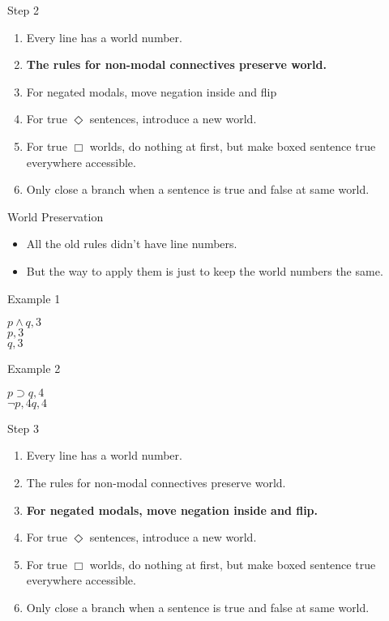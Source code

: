\documentclass[
  14pt,
  letterpaper,
  ignorenonframetext,
  aspectratio=169,
  handout]{beamer}
\providecommand{\tightlist}{%
  \setlength{\itemsep}{0pt}\setlength{\parskip}{0pt}}\usepackage{longtable,booktabs,array}
\begin{document}
\begin{frame}{Step 2}
\protect\hypertarget{step-2}{}
\begin{enumerate}
\tightlist
\item
  Every line has a world number.
\item
  \textbf{The rules for non-modal connectives preserve world.}
\item
  For negated modals, move negation inside and flip
\item
  For true \(\Diamond\) sentences, introduce a new world.
\item
  For true \(\Box\) worlds, do nothing at first, but make boxed sentence
  true everywhere accessible.
\item
  Only close a branch when a sentence is true and false at same world.
\end{enumerate}
\end{frame}

\begin{frame}{World Preservation}
\protect\hypertarget{world-preservation}{}
\begin{itemize}
\tightlist
\item
  All the old rules didn't have line numbers.
\item
  But the way to apply them is just to keep the world numbers the same.
\end{itemize}
\end{frame}

\begin{frame}{Example 1}
\protect\hypertarget{example-1}{}
\begin{center}
$p \wedge q, 3$ \\
$p, 3$ \\
$q, 3$ \\
\end{center}
\end{frame}

\begin{frame}{Example 2}
\protect\hypertarget{example-2}{}
\begin{center}
$p \supset q, 4$ \\
$\neg p, 4               q, 4$ \\
\end{center}
\end{frame}

\begin{frame}{Step 3}
\protect\hypertarget{step-3}{}
\begin{enumerate}
\tightlist
\item
  Every line has a world number.
\item
  The rules for non-modal connectives preserve world.
\item
  \textbf{For negated modals, move negation inside and flip.}
\item
  For true \(\Diamond\) sentences, introduce a new world.
\item
  For true \(\Box\) worlds, do nothing at first, but make boxed sentence
  true everywhere accessible.
\item
  Only close a branch when a sentence is true and false at same world.
\end{enumerate}
\end{frame}
\end{document}
